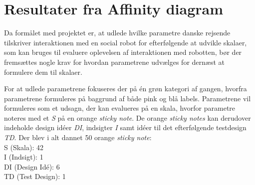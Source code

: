 \section{Resultater fra Affinity diagram}
\label{ParametreDatabehandlingAffinityDiagram}
%
%
Da formålet med projektet er, at udlede hvilke parametre danske rejsende tilskriver interaktionen med en social robot for efterfølgende at udvikle skalaer, som kan bruges til evaluere oplevelsen af interaktionen med robotten, bør der fremsættes nogle krav for hvordan parametrene udvælges for dernæst at formulere dem til skalaer. 

For at udlede parametrene fokuseres der på én grøn kategori af gangen, hvorfra parametrene formuleres på baggrund af både pink og blå labels. Parametrene vil formuleres som et udsagn, der kan evalueres på en skala, hvorfor parametre noteres med et \textit{S} på en orange \textit{sticky note}. De orange \textit{sticky notes} kan derudover indeholde design idéer \textit{DI}, indsigter \textit{I} samt idéer til det efterfølgende testdesign \textit{TD}. \blankline
%
Der blev i alt dannet 50 orange \textit{sticky note}: \\
S (Skala): 42\\
I (Indsigt): 1\\
DI (Design Idé): 6\\
TD (Test Design): 1\\


